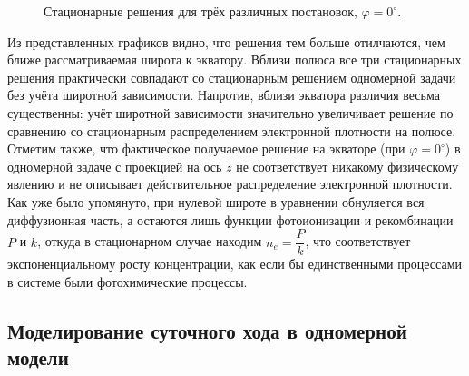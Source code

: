 \documentclass[14pt, a4paper, fleqn]{extarticle}
\begin{document}
\begin{figure}[H]
\caption{Стационарные решения для трёх различных постановок, $\varphi = 0^\circ$.}
\end{figure}

Из представленных графиков видно, что решения тем больше отилчаются, чем ближе рассматриваемая широта к экватору. Вблизи полюса все три стационарных решения практически совпадают со стационарным решением одномерной задачи без учёта широтной зависимости. Напротив, вблизи экватора различия весьма существенны: учёт широтной зависимости значительно увеличивает решение по сравнению со стационарным распределением электронной плотности на полюсе. Отметим также, что фактическое получаемое решение на экваторе (при $\varphi = 0^\circ$) в одномерной задаче с проекцией на ось $z$ не соответствует никакому физическому явлению и не описывает действительное распределение электронной плотности. Как уже было упомянуто, при нулевой широте в уравнении обнуляется вся диффузионная часть, а остаются лишь функции фотоионизации и рекомбинации $P$ и $k$, откуда в стационарном случае находим $n_e = \dfrac{P}{k}$, что соответствует экспоненциальному росту концентрации, как если бы единственными процессами в системе были фотохимические процессы.




\subsection{Моделирование суточного хода в одномерной модели}
\end{document}
